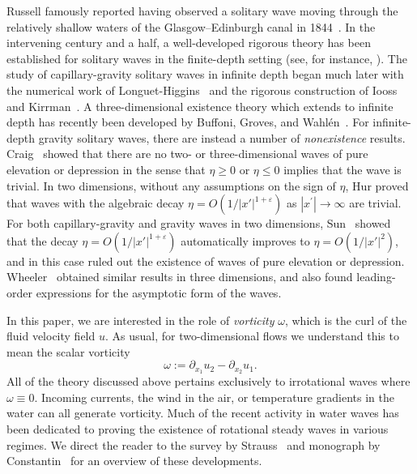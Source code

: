 \documentclass[11pt,reqno]{amsart}
\theoremstyle{plain}
\theoremstyle{remark}
\numberwithin{equation}{section}
\begin{document}
Russell famously reported having observed a solitary wave moving through the relatively shallow waters of the Glasgow--Edinburgh canal in 1844~\cite{russell1844report}.  In the intervening century and a half, a well-developed rigorous theory has been established for solitary waves in the finite-depth setting (see, for instance, \cite{miles1980solitary, groves2004steady,amick1982stokes,craig1988symmetry}). The study of capillary-gravity solitary waves in infinite depth began much later with the numerical work of Longuet-Higgins~\cite{longuet1988limiting,longuet1989capillary} and the rigorous construction of Iooss and Kirrman~\cite{iooss1996capillary}. A three-dimensional existence theory which extends to infinite depth has recently been developed by Buffoni, Groves, and Wahl\'en~\cite{buffoni2016variational}.
For infinite-depth gravity solitary waves, there are instead a number of \emph{nonexistence} results. Craig~\cite{craig2002nonexistence} showed that there are no two- or three-dimensional waves of pure elevation or depression in the sense that $\eta \geq 0$ or $\eta \leq 0$ implies that the wave is trivial.  In two dimensions, without any assumptions on the sign of $\eta$, Hur \cite{hur2012no} proved that waves with the algebraic decay $\eta = O(1/|x'|^{1+\varepsilon})$ as $|x^\prime| \to \infty$ are trivial. For both capillary-gravity and gravity waves in two dimensions, Sun~\cite{sun1997analytical} showed that the decay $\eta = O(1/|x'|^{1+\varepsilon})$ automatically improves to $\eta = O(1/|x'|^2)$, and in this case ruled out the existence of waves of pure elevation or depression. Wheeler~\cite{wheeler2016integral} obtained similar results in three dimensions, and also found leading-order expressions for the asymptotic form of the waves.

In this paper, we are interested in the role of \emph{vorticity} $\omega$, which is the curl of the fluid velocity field $u$.  As usual, for two-dimensional flows we understand this to mean the scalar vorticity
\[ 
  \omega := \partial_{x_1} u_2 - \partial_{x_2} u_1.
\]
All of the theory discussed above pertains exclusively to irrotational waves where $\omega \equiv 0$.   Incoming currents, the wind in the air, or temperature gradients in the water can all generate vorticity.  Much of the recent activity in water waves has been dedicated to proving the existence of rotational steady waves in various regimes.  We direct the reader to the survey by Strauss~\cite{strauss2010steady} and monograph by Constantin~\cite{constantin2011book} for an overview of these developments.  
\end{document}

